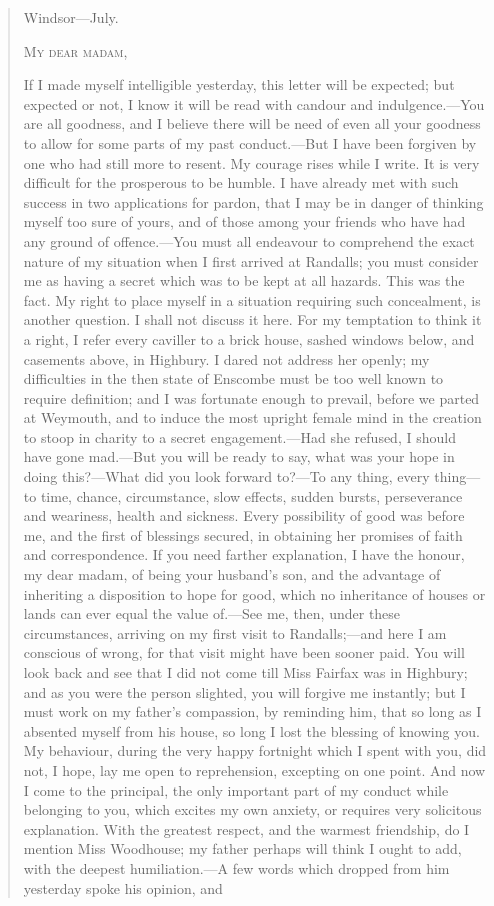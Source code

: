 \begin{quotation}
\begin{flushright}
Windsor—July.
\end{flushright}

\noindent\textsc{My dear madam,}

\indent If I made myself intelligible yesterday, this letter will be expected; but expected or not, I know it will be read with candour and indulgence.—You are all goodness, and I believe there will be need of even all your goodness to allow for some parts of my past conduct.—But I have been forgiven by one who had still more to resent. My courage rises while I write. It is very difficult for the prosperous to be humble. I have already met with such success in two applications for pardon, that I may be in danger of thinking myself too sure of yours, and of those among your friends who have had any ground of offence.—You must all endeavour to comprehend the exact nature of my situation when I first arrived at Randalls; you must consider me as having a secret which was to be kept at all hazards. This was the fact. My right to place myself in a situation requiring such concealment, is another question. I shall not discuss it here. For my temptation to think it a right, I refer every caviller to a brick house, sashed windows below, and casements above, in Highbury. I dared not address her openly; my difficulties in the then state of Enscombe must be too well known to require definition; and I was fortunate enough to prevail, before we parted at Weymouth, and to induce the most upright female mind in the creation to stoop in charity to a secret engagement.—Had she refused, I should have gone mad.—But you will be ready to say, what was your hope in doing this?—What did you look forward to?—To any thing, every thing—to time, chance, circumstance, slow effects, sudden bursts, perseverance and weariness, health and sickness. Every possibility of good was before me, and the first of blessings secured, in obtaining her promises of faith and correspondence. If you need farther explanation, I have the honour, my dear madam, of being your husband's son, and the advantage of inheriting a disposition to hope for good, which no inheritance of houses or lands can ever equal the value of.—See me, then, under these circumstances, arriving on my first visit to Randalls;—and here I am conscious of wrong, for that visit might have been sooner paid. You will look back and see that I did not come till Miss Fairfax was in Highbury; and as you were the person slighted, you will forgive me instantly; but I must work on my father's compassion, by reminding him, that so long as I absented myself from his house, so long I lost the blessing of knowing you. My behaviour, during the very happy fortnight which I spent with you, did not, I hope, lay me open to reprehension, excepting on one point. And now I come to the principal, the only important part of my conduct while belonging to you, which excites my own anxiety, or requires very solicitous explanation. With the greatest respect, and the warmest friendship, do I mention Miss Woodhouse; my father perhaps will think I ought to add, with the deepest humiliation.—A few words which dropped from him yesterday spoke his opinion, and 
\end{quotation}
